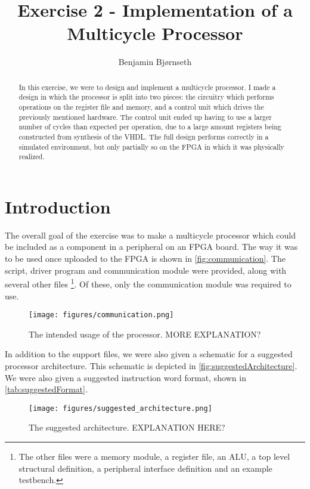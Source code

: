 \documentclass[11pt]{article}
\title{Exercise 2 - Implementation of a Multicycle Processor}
\author{Benjamin Bj\o rnseth}
\begin{document}
\maketitle

\begin{abstract}
  In this exercise, we were to design and implement a multicycle processor. I
  made a design in which the processor is split into two pieces: the circuitry
  which performs operations on the register file and memory, and a control unit
  which drives the previously mentioned hardware. The control unit ended up
  having to use a larger number of cycles than expected per operation, due to a
  large amount registers being constructed from synthesis of the VHDL. The full
  design performs correctly in a simulated environment, but only partially so on
  the FPGA in which it was physically realized.
\end{abstract}

\section{Introduction}
\label{sec:introduction}
The overall goal of the exercise was to make a multicycle processor
which could be included as a component in a peripheral on an FPGA
board. The way it was to be used once uploaded to the FPGA is shown in
\autoref{fig:communication}. The script, driver program and
communication module were provided, along with several other files
\footnote{The other files were a memory module, a register file, an
  ALU, a top level structural definition, a peripheral interface
  definition and an example testbench.}. Of these, only the
communication module was required to use.

\begin{figure}[ht]
  \centering
  \texttt{[image: figures/communication.png]}
  \caption{\label{fig:communication} The intended usage of the
    processor. MORE EXPLANATION?}
\end{figure}

In addition to the support files, we were also given a schematic for a
suggested processor architecture. This schematic is depicted in
\autoref{fig:suggestedArchitecture}. We were also given a suggested
instruction word format, shown in \autoref{tab:suggestedFormat}.
\begin{figure}[ht]
  \centering
  \texttt{[image: figures/suggested\_architecture.png]}
  \caption{\label{fig:suggestedArchitecture} The suggested architecture. EXPLANATION HERE?}
\end{figure}
\end{document}
